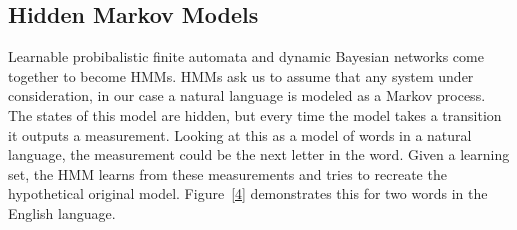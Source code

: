 \documentclass[10pt]{article}
\begin{document}
\subsection{Hidden Markov Models}
Learnable probibalistic finite automata and dynamic Bayesian networks come
together to become HMMs. HMMs ask us to assume that any system under consideration, 
in our case a natural language is modeled as a Markov process. The states of
this model are hidden, but every time the model takes a transition it outputs a
measurement. Looking at this as a model of words in a natural language, the
measurement could be the next letter in the word. Given a learning set, the HMM
learns from these measurements and tries to recreate the hypothetical original
model. Figure~\ref{4} demonstrates this for two words in the English language.
\vspace{4em}
\end{document}
